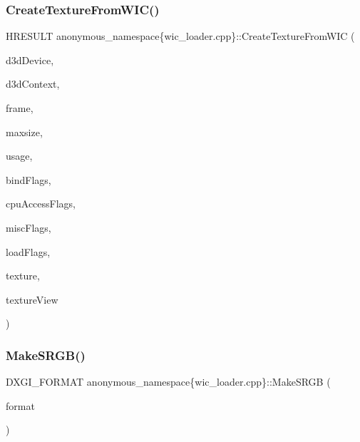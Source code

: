 \subsubsection{\texorpdfstring{Create\+Texture\+From\+W\+I\+C()}{CreateTextureFromWIC()}}
{\footnotesize\ttfamily H\+R\+E\+S\+U\+LT anonymous\+\_\+namespace\{wic\+\_\+loader.\+cpp\}\+::Create\+Texture\+From\+W\+IC (\begin{DoxyParamCaption}\item[{\+\_\+\+In\+\_\+ I\+D3\+D11\+Device $\ast$}]{d3d\+Device,  }\item[{\+\_\+\+In\+\_\+opt\+\_\+ I\+D3\+D11\+Device\+Context $\ast$}]{d3d\+Context,  }\item[{\+\_\+\+In\+\_\+ I\+W\+I\+C\+Bitmap\+Frame\+Decode $\ast$}]{frame,  }\item[{\+\_\+\+In\+\_\+ size\+\_\+t}]{maxsize,  }\item[{\+\_\+\+In\+\_\+ D3\+D11\+\_\+\+U\+S\+A\+GE}]{usage,  }\item[{\+\_\+\+In\+\_\+ unsigned int}]{bind\+Flags,  }\item[{\+\_\+\+In\+\_\+ unsigned int}]{cpu\+Access\+Flags,  }\item[{\+\_\+\+In\+\_\+ unsigned int}]{misc\+Flags,  }\item[{\+\_\+\+In\+\_\+ unsigned int}]{load\+Flags,  }\item[{\+\_\+\+Outptr\+\_\+opt\+\_\+ I\+D3\+D11\+Resource $\ast$$\ast$}]{texture,  }\item[{\+\_\+\+Outptr\+\_\+opt\+\_\+ I\+D3\+D11\+Shader\+Resource\+View $\ast$$\ast$}]{texture\+View }\end{DoxyParamCaption})}

\mbox{\label{namespaceanonymous__namespace_02wic__loader_8cpp_03_ac45d001476239afc908a943be5b73132}} 
\subsubsection{\texorpdfstring{Make\+S\+R\+G\+B()}{MakeSRGB()}}
{\footnotesize\ttfamily D\+X\+G\+I\+\_\+\+F\+O\+R\+M\+AT anonymous\+\_\+namespace\{wic\+\_\+loader.\+cpp\}\+::Make\+S\+R\+GB (\begin{DoxyParamCaption}\item[{\+\_\+\+In\+\_\+ D\+X\+G\+I\+\_\+\+F\+O\+R\+M\+AT}]{format }\end{DoxyParamCaption})}

